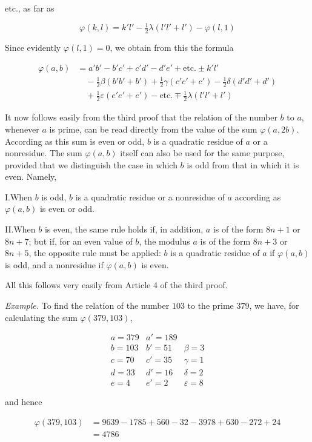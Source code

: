 etc., as far as

\[
\varphi(k,l)=k'l'-\tfrac12\lambda(l'l'+l')-\varphi(l,1)
\]

Since evidently $\varphi(l,1)=0$, we obtain from this the formula

\[
\begin{aligned}
\varphi(a,b)&=a'b'-b'c'+c'd'-d'e'+\text{etc.}\pm k'l'\\
&\quad-\tfrac12\beta(b'b'+b')+\tfrac12\gamma(c'c'+c')-\tfrac12\delta(d'd'+d')\\
&\quad+\tfrac12\varepsilon(e'e'+e')-\text{etc.}\mp\tfrac12\lambda(l'l'+l')
\end{aligned}
\]


It now follows easily from the third proof that the relation of the number $b$ to $a$, whenever $a$ is prime, can be read directly from the value of the sum $\varphi(a,2b)$. According as this sum is even or odd, $b$ is a quadratic residue of $a$ or a nonresidue. The sum $\varphi(a,b)$ itself can also be used for the same purpose, provided that we distinguish the case in which $b$ is odd from that in which it is even. Namely,

I.\quad When $b$ is odd, $b$ is a quadratic residue or a nonresidue of $a$ according as $\varphi(a,b)$ is even or odd.

II.\quad When $b$ is even, the same rule holds if, in addition, $a$ is of the form $8n+1$ or $8n+7$; but if, for an even value of $b$, the modulus $a$ is of the form $8n+3$ or $8n+5$, the opposite rule must be applied: $b$ is a quadratic residue of $a$ if $\varphi(a,b)$ is odd, and a nonresidue if $\varphi(a,b)$ is even.

All this follows very easily from Article 4 of the third proof.

\newpage
{}

\textit{Example.} To find the relation of the number $103$ to the prime $379$, we have, for calculating the sum $\varphi(379,103)$,

\[
\begin{array}{r|r|l}
a=379&a'=189&\\
b=103&b'=51&\beta=3\\
c=70&c'=35&\gamma=1\\
d=33&d'=16&\delta=2\\
e=4&e'=2&\varepsilon=8
\end{array}
\]

and hence

\[
\begin{aligned}
\varphi(379,103)&=9639-1785+560-32-3978+630-272+24\\
&=4786
\end{aligned}
\]

